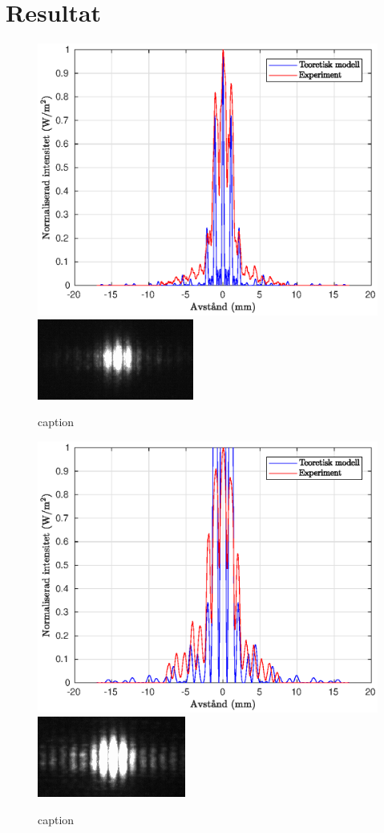 \documentclass[a4paper]{article}
\begin{document}
\section{Resultat}

\FloatBarrier
\begin{figure}[h!]
	\centering
	\includegraphics[width=0.75\linewidth]{Data/Figurer/4spalt.eps}
	\includegraphics[width=0.5\linewidth]{Data/Figurer/4spalt.png}
	\caption{caption}
	\label{fig:4spalt}
\end{figure}

\begin{figure}[h!]
	\centering
	\includegraphics[width=0.75\linewidth]{Data/Figurer/dubbelspalt.eps}
	\includegraphics[width=0.5\linewidth]{Data/Figurer/dubbelspalt.png}
	\caption{caption}
	\label{fig:dubbelspalt}
\end{figure}
\end{document}
